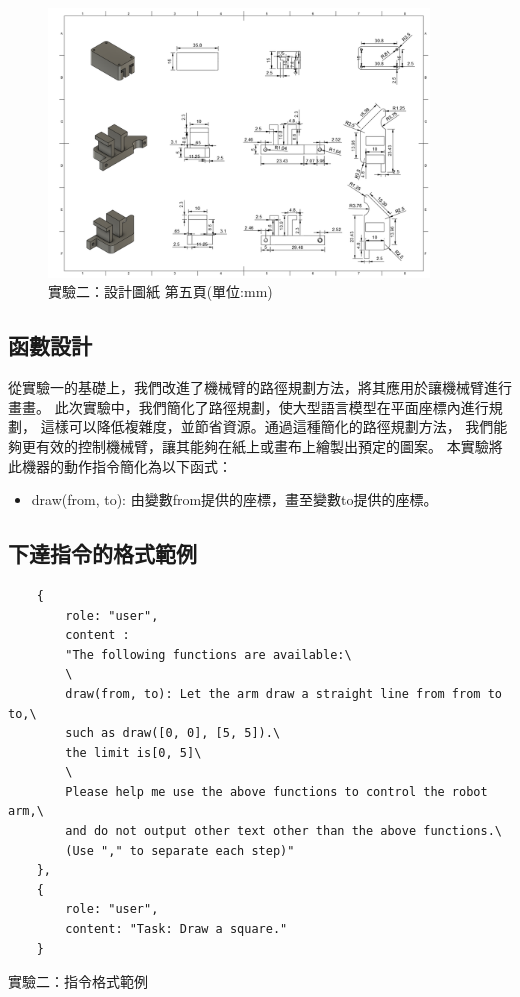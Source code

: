 \documentclass[class=NCU_thesis, crop=false]{standalone}
\begin{document}
\begin{figure}[htbp]
    \centering
    \includegraphics[width=0.9\textwidth]{figures/Armv2 (5).PNG}
    \caption{實驗二：設計圖紙 第五頁(單位:mm)}
\end{figure}

\subsection{函數設計}
從實驗一的基礎上，我們改進了機械臂的路徑規劃方法，將其應用於讓機械臂進行畫畫。
此次實驗中，我們簡化了路徑規劃，使大型語言模型在平面座標內進行規劃，
這樣可以降低複雜度，並節省資源。通過這種簡化的路徑規劃方法，
我們能夠更有效的控制機械臂，讓其能夠在紙上或畫布上繪製出預定的圖案。
本實驗將此機器的動作指令簡化為以下函式：

\begin{itemize}
    \item draw(from, to): 由變數from提供的座標，畫至變數to提供的座標。
\end{itemize}
\clearpage
\subsection{下達指令的格式範例}
\begin{listing}[h]
    \begin{verbatim}
    {     
        role: "user",
        content : 
        "The following functions are available:\
        \
        draw(from, to): Let the arm draw a straight line from from to to,\
        such as draw([0, 0], [5, 5]).\
        the limit is[0, 5]\
        \
        Please help me use the above functions to control the robot arm,\
        and do not output other text other than the above functions.\
        (Use "," to separate each step)"
    },
    {
        role: "user", 
        content: "Task: Draw a square."
    }
    \end{verbatim}
\caption{實驗二：指令格式範例} 
\end{listing}
\end{document}
